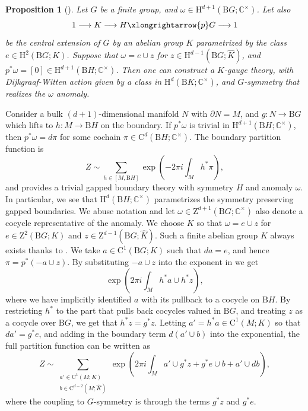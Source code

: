 \documentclass[11pt,reqno]{amsart}
\newenvironment{proofsketch}{%
  \renewcommand{\proofname}{Proof Sketch}\proof}{\endproof}
\newcommand{\rH}{\mathrm{H}}
\newcommand{\rB}{\mathrm{B}}
\numberwithin{equation}{section}
\theoremstyle{plain}
\newtheorem{prop}[equation]{Proposition}
\theoremstyle{definition}
\begin{document}
\begin{prop}[\cite{Wang:2017loc}]
Let $G$ be a finite group, and $\omega \in \rH^{d+1}(\rB G; \mathbb C^\times)$. Let also
\begin{equation}
    1 \longrightarrow K \longrightarrow H \xlongrightarrow{p} G \longrightarrow 1
\end{equation}
be the central extension of $G$ by an abelian group $K$ parametrized by the class $e\in \rH^2(\rB G; K)$. Suppose that $\omega = e \cup z$ for $z \in \rH^{d-1}(\rB G; \widehat{K})$, and $p^* \omega =[0] \in \rH^{d+1}(\rB H;\mathbb C^\times)$. Then one can construct a $K$-gauge theory, with Dijkgraaf-Witten action given by a class in $\rH^d(\rB K; \mathbb{C}^\times)$, and $G$-symmetry that realizes the $\omega$ anomaly. 
\end{prop}
\begin{proofsketch}
Consider a bulk $(d+1)$-dimensional manifold $N$ with $\partial N = M$, and $g: N \rightarrow \rB G$ which lifts to $h: M\rightarrow \rB H$ on the boundary.
If  $p^* \omega$ is trivial in $\rH^{d+1}(\rB H;\mathbb C^\times)$, then $p^* \omega = d \pi$ for some cochain $\pi \in \mathrm C^d(\rB H;\mathbb C^\times)$. The boundary partition function is 
\begin{equation}\label{eq:boundaryaction}
   Z \sim \sum_{h\in [M,\rB H]}  \exp\left(-2 \pi i \int_M h^*\pi \right),
\end{equation}
and provides a trivial gapped boundary theory with symmetry $H$ and anomaly $\omega$. In particular, we see that $\rH^{d}(\rB H; \mathbb{C}^\times)$ parametrizes the symmetry preserving gapped boundaries. We abuse notation and let $\omega\in \mathrm{Z}^{d+1}(\rB G; \mathbb{C}^\times) $ also denote a cocycle representative of the anomaly. We choose $K$ so that $\omega = e \cup z$ for $e \in \mathrm{Z}^{2}(\rB G ; K)$ and $z \in \mathrm{Z}^{d-1}(\rB G ; \widehat{K})$. Such a finite abelian group $K$ always exists thanks to \cite{Tachikawa:2017gyf}. We take $a \in \mathrm{C}^1(\rB G;K)$ such that $d a = e$, and hence $\pi = p^*(- a \cup z)$. 
By substituting $- a \cup z$ into the exponent in  we get 
\begin{equation}
    \exp\left( 2\pi i \int_M h^* a \cup h^* z \right), 
\end{equation}
where we have implicitly identified $a$ with its pullback to a cocycle on $\rB H$.
By restricting $h^*$ to the part that pulls back cocycles valued in $\rB G$, and treating $z$ as a cocycle over $\rB G$, we get that $h^* z = g^*z$. Letting $a' = h^*a  \in \mathrm{C}^1(M; K)$ so that $d a' = g^* e$, and adding in the boundary term $d (a' \cup b)$ into the exponential, the full partition function can be written as 
\begin{equation}\label{eq:full}
   Z \sim \sum_{\substack{a' \in \mathrm{C}^1(M;K) \\ b\in \mathrm{C}^{d-2}(M;\widehat{K})}}  \exp\left(2 \pi i \int_M a' \cup g^*z +g^*e \cup b + a'\cup db \right),
\end{equation}
where the coupling to $G$-symmetry is through the terms $g^*z$ and $g^*e$.
\end{proofsketch}
\end{document}
